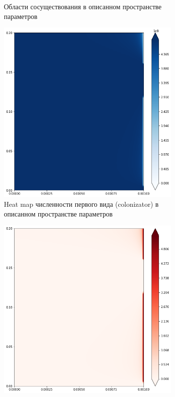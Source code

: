 \begin{figure}
\begin{subfigure}{.5\textwidth}
		\caption{Области сосуществования в описанном пространстве параметров}
		\label{fig:cctod3:sub2}
	\end{subfigure}
	\centering
	\begin{subfigure}{.5\textwidth}
		\centering
		\includegraphics[width=.95\linewidth]{ccto_d3_n2.png}
		\caption{Heat map численности первого вида (colonizator) в описанном пространстве параметров}
		\label{fig:cctod3:sub3}
	\end{subfigure}%
	\begin{subfigure}{.5\textwidth}
		\centering
		\includegraphics[width=.95\linewidth]{ccto_d3_n1.png}

\end{subfigure}
\end{figure}
